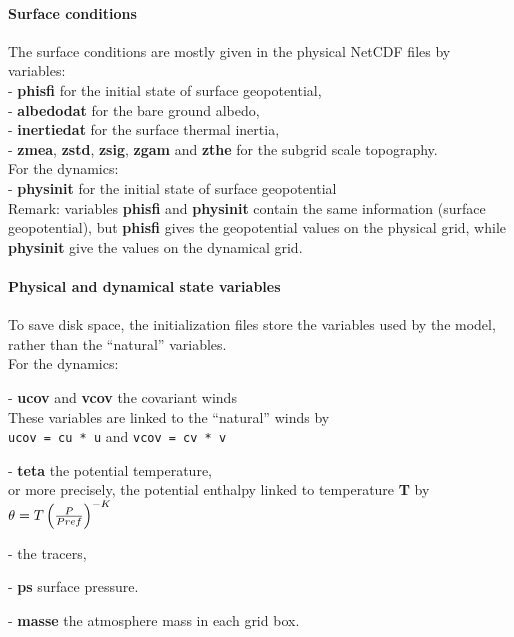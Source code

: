\paragraph{Surface conditions}

The surface conditions are mostly given in the physical NetCDF files by
variables:\\
- {\bf phisfi} for the initial state of surface geopotential,\\
- {\bf albedodat} for the bare ground albedo,\\
- {\bf inertiedat} for the surface thermal inertia,\\
- {\bf zmea}, {\bf zstd}, {\bf zsig}, {\bf zgam} and {\bf zthe} for
  the subgrid scale topography.\\

\noindent
For the dynamics:\\
- {\bf physinit} for the initial state of surface geopotential\\

\noindent
Remark: variables {\bf phisfi} and {\bf physinit} contain the same information
(surface geopotential), but {\bf phisfi} gives the geopotential values on the
physical grid, while {\bf physinit} give the values on the dynamical grid.\\

\paragraph{Physical and dynamical state variables}
To save disk space, the initialization files store the variables used by
the model, rather than the ``natural'' variables.\\

\noindent
For the dynamics:
\begin{description}
\item - {\bf ucov} and {\bf vcov} the covariant winds\\
These variables are linked to the ``natural'' winds by\\
\verb+ucov = cu * u+ and \verb+vcov = cv * v+
\item - {\bf teta} the potential temperature,\\
  or more precisely, the potential enthalpy linked to temperature {\bf T} by
  $\theta = T\left( \frac{P}{Pref} \right)^{-K}$
\item - the tracers,
\item - {\bf ps} surface pressure.
\item - {\bf masse} the atmosphere mass in each grid box.
\end{description}

